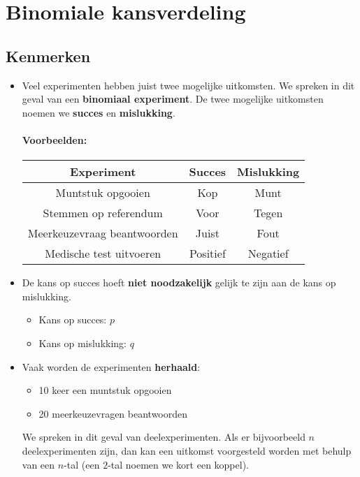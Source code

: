 \documentclass[a4paper,12pt, twoside]{article}
\begin{document}
\cleardoublepage
\section{Binomiale kansverdeling}

\subsection{Kenmerken}

\begin{itemize}
  \item Veel experimenten hebben juist twee mogelijke uitkomsten. We spreken in dit geval van een {\bf binomiaal experiment}. De twee mogelijke uitkomsten noemen we {\bf succes} en {\bf mislukking}.
  \paragraph*{Voorbeelden:}
  \begin{center}
    \begin{tabular}{c|c|c}
    Experiment & Succes & Mislukking\\
    \hline
    Muntstuk opgooien & Kop & Munt\\
    Stemmen op referendum & Voor & Tegen\\
    Meerkeuzevraag beantwoorden & Juist & Fout\\
    Medische test uitvoeren & Positief & Negatief\\
    \end{tabular}
  \end{center}
  \item De kans op succes hoeft {\bf niet noodzakelijk} gelijk te zijn aan de kans op mislukking.
  \begin{itemize}
    \item Kans op succes: $p$
    \item Kans op mislukking: $q$
  \end{itemize}
  \item Vaak worden de experimenten {\bf herhaald}:
  \begin{itemize}
    \item 10 keer een muntstuk opgooien
    \item 20 meerkeuzevragen beantwoorden
  \end{itemize}
  We spreken in dit geval van deelexperimenten. Als er bijvoorbeeld $n$ deelexperimenten zijn, dan kan een uitkomst voorgesteld worden met behulp van een $n$-tal (een $2$-tal noemen we kort een koppel).
\end{itemize}
\end{document}
